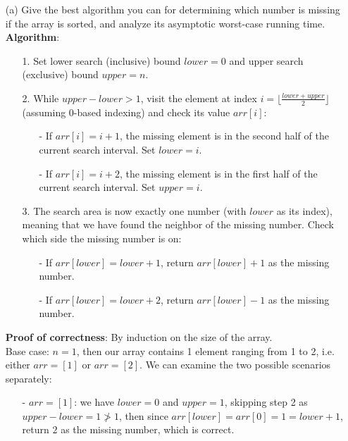 \documentclass{article}
\begin{document}
\begin{itemize}
\begin{itemize}
              \item [(a)] Give the best algorithm you can for determining which number is missing if the array is sorted, and analyze its asymptotic worst-case running time.\\
                    \textbf{Algorithm}:
                    \begin{itemize}
                        \item [1.] Set lower search (inclusive) bound $lower=0$ and upper search (exclusive) bound $upper=n$.
                        \item [2.] While $upper-lower>1$, visit the element at index $i=\lfloor\frac{lower+upper}{2}\rfloor$ (assuming 0-based indexing) and check its value $arr[i]$:
                              \begin{itemize}
                                  \item [-] If $arr[i]=i+1$, the missing element is in the second half of the current search interval. Set $lower=i$.
                                  \item [-] If $arr[i]=i+2$, the missing element is in the first half of the current search interval. Set $upper=i$.
                              \end{itemize}
                        \item [3.] The search area is now exactly one number (with $lower$ as its index), meaning that we have found the neighbor of the missing number. Check which side the missing number is on:
                              \begin{itemize}
                                  \item [-] If $arr[lower]=lower+1$, return $arr[lower]+1$ as the missing number.
                                  \item [-] If $arr[lower]=lower+2$, return $arr[lower]-1$ as the missing number.
                              \end{itemize}
                    \end{itemize}
                    \textbf{Proof of correctness}: By induction on the size of the array.\\
                    Base case: $n=1$, then our array contains 1 element ranging from 1 to 2, i.e. either $arr=[1]$ or $arr=[2]$. We can examine the two possible scenarios separately:
                    \begin{itemize}
                        \item [-] $arr=[1]$: we have $lower=0$ and $upper=1$, skipping step 2 as $upper-lower=1\ngtr 1$, then since $arr[lower]=arr[0]=1=lower+1$, return $2$ as the missing number, which is correct.

\end{itemize}
\end{itemize}
\end{itemize}
\end{document}
